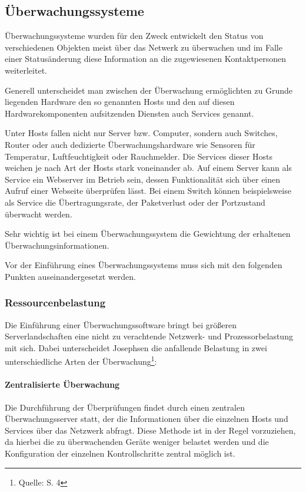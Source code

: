 \subsection{Überwachungssysteme}
\label{monitor}
Überwachungssysteme wurden für den Zweck entwickelt den Status von verschiedenen Objekten meist über das Netwerk zu überwachen und im Falle einer Statusänderung diese Information an die zugewiesenen Kontaktpersonen weiterleitet.

Generell unterscheidet man zwischen der Überwachung ermöglichten zu Grunde liegenden Hardware den so genannten Hosts und den auf diesen Hardwarekomponenten aufsitzenden Diensten auch Services genannt.

Unter Hosts fallen nicht nur Server bzw. Computer, sondern auch Switches, Router oder auch dedizierte Überwachungshardware wie Sensoren für Temperatur, Luftfeuchtigkeit oder Rauchmelder.
Die Services dieser Hosts weichen je nach Art der Hosts stark voneinander ab.
Auf einem Server kann als Service ein Webserver im Betrieb sein, dessen Funktionalität sich über einen Aufruf einer Webseite überprüfen lässt.
Bei einem Switch können beispielsweise als Service die Übertragungsrate, der Paketverlust oder der Portzustand überwacht werden.

Sehr wichtig ist bei einem Überwachungssystem die Gewichtung der erhaltenen Überwachungsinformationen.


\newpage
Vor der Einführung eines Überwachungssystems muss sich mit den folgenden Punkten auseinandergesetzt werden.

\subsubsection{Ressourcenbelastung}
Die Einführung einer Überwachungssoftware bringt bei größeren Serverlandschaften eine nicht zu verachtende Netzwerk- und Prozessorbelastung mit sich.
Dabei unterscheidet Josephsen die anfallende Belastung in zwei unterschiedliche Arten der Überwachung\footnote{Quelle: \cite{Jose07} S. 4}:

\paragraph{Zentralisierte Überwachung}
Die Durchführung der Überprüfungen findet durch einen zentralen Überwachungsserver statt, der die Informationen über die einzelnen Hosts und Services über das Netzwerk abfragt.
Diese Methode ist in der Regel vorzuziehen, da hierbei die zu überwachenden Geräte weniger belastet werden und die Konfiguration der einzelnen Kontrollschritte zentral möglich ist.

